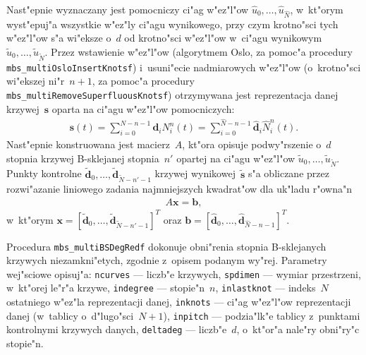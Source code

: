 Nast"epnie wyznaczany jest pomocniczy ci"ag w"ez"l"ow
$\hat{u}_0,\ldots,\hat{u}_{\hat{N}}$, w~kt"orym wyst"epuj"a wszystkie w"ez"ly
ci"agu wynikowego, przy czym krotno"sci tych w"ez"l"ow s"a wi"eksze
o~$d$ od krotno"sci w"ez"l"ow w~ci"agu wynikowym
$\tilde{u}_0,\ldots,\tilde{u}_{\tilde{N}}$. Przez wstawienie w"ez"l"ow
(algorytmem Oslo, za pomoc"a procedury \texttt{mbs\_multiOsloInsertKnotsf})
i~usuni"ecie nadmiarowych w"ez"l"ow (o~krotno"sci wi"ekszej ni"r~$n+1$,
za pomoc"a procedury \texttt{mbs\_multiRemoveSuperfluousKnotsf}) otrzymywana
jest reprezentacja danej krzywej~$\bm{s}$ oparta na ci"agu w"ez"l"ow
pomocniczych:
\begin{align*}
  \bm{s}(t) = \sum_{i=0}^{N-n-1}\bm{d}_iN^n_i(t) =
  \sum_{i=0}^{\hat{N}-n-1}\hat{\bm{d}}_i\hat{N}^n_i(t).
\end{align*}
Nast"epnie konstruowana jest macierz~$A$, kt"ora opisuje podwy"rszenie o~$d$
stopnia krzywej B-sklejanej stopnia~$n'$ opartej na ci"agu w"ez"l"ow
$\tilde{u}_0,\ldots,\tilde{u}_{\tilde{N}}$. Punkty kontrolne
$\tilde{\bm{d}}_0,\ldots,\tilde{\bm{d}}_{\tilde{N}-n'-1}$ krzywej
wynikowej~$\tilde{\bm{s}}$ s"a obliczane przez rozwi"azanie liniowego
zadania najmniejszych kwadrat"ow dla uk"ladu r"owna"n
\begin{align*}
  A\bm{x}=\bm{b},
\end{align*}
w~kt"orym $\bm{x}=[\tilde{\bm{d}}_0,\ldots,\tilde{\bm{d}}_{\tilde{N}-n'-1}]^T$
oraz $\bm{b}=[\hat{\bm{d}}_0,\ldots,\hat{\bm{d}}_{\hat{N}-n-1}]^T$.


\vspace{\bigskipamount}
Procedura \texttt{mbs\_multiBSDegRedf} dokonuje obni"renia stopnia B-sklejanych
krzywych niezamkni"etych, zgodnie z~opisem podanym wy"rej. Parametry wej"sciowe
opisuj"a: \texttt{ncurves} --- liczb"e krzywych, \texttt{spdimen} --- wymiar
przestrzeni, w~kt"orej le"r"a krzywe, \texttt{indegree} --- stopie"n~$n$,
\texttt{inlastknot} --- indeks~$N$ ostatniego w"ez"la reprezentacji danej,
\texttt{inknots} --- ci"ag w"ez"l"ow reprezentacji danej (w~tablicy
o~d"lugo"sci~$N+1$), \texttt{inpitch} --- podzia"lk"e tablicy z~punktami
kontrolnymi krzywych danych, \texttt{deltadeg} --- liczb"e~$d$, o~kt"or"a
nale"ry obni"ry"c stopie"n.

